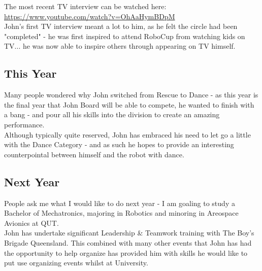 			The most recent TV interview can be watched here:\\
			
			\url{https://www.youtube.com/watch?v=OhAaHymBDpM}\\
		
			John's first TV interview meant a lot to him, as he felt the circle had been "completed" - he was first inspired to attend RoboCup from watching kids on TV... he was now able to inspire others through appearing on TV himself.
		
		\subsection{This Year}
			Many people wondered why John switched from Rescue to Dance - as this year is the final year that John Board will be able to compete, he wanted to finish with a bang - and pour all his skills into the  division to create an amazing performance.\\
			
			Although typically quite reserved, John has embraced his need to let go a little with the Dance Category - and as such he hopes to provide an interesting counterpointal  between himself and the robot with dance. \\
			
		\subsection{Next Year}
			People ask me what I would like to do next year - I am goaling to study a Bachelor of Mechatronics, majoring in Robotics and minoring in Areospace Avionics at QUT.\\
			
			John has undertake significant Leadership \& Teamwork training with The Boy's Brigade Queensland. This combined with many other events that John has had the opportunity to help organize has provided him with skills he would like to put use organizing events whilst at University.